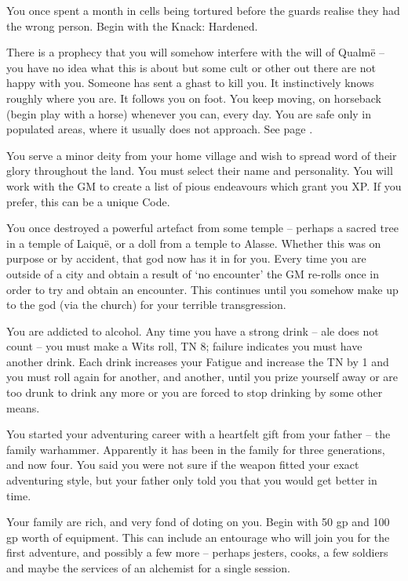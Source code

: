 \begin{multicols}{2}
\begin{list}{\addtocounter{list}{1}\textbf{:}}{\raggedleft}
\item{You once spent a month in cells being tortured before the guards realise they had the wrong person.  Begin with the Knack: Hardened.}

\item{There is a prophecy that you will somehow interfere with the will of Qualm\"{e} -- you have no idea what this is about but some cult or other out there are not happy with you.  Someone has sent a ghast to kill you.  It instinctively knows roughly where you are.  It follows you on foot. You keep moving, on horseback (begin play with a horse) whenever you can, every day.  You are safe only in populated areas, where it usually does not approach.  See page \pageref{ghast}.}

\item{You serve a minor deity from your home village and wish to spread word of their glory throughout the land.  You must select their name and personality.  You will work with the GM to create a list of pious endeavours which grant you XP.  If you prefer, this can be a unique Code.}

\item{You once destroyed a powerful artefact from some temple -- perhaps a sacred tree in a temple of Laiqu\"{e}, or a doll from a temple to Alasse.
Whether this was on purpose or by accident, that god now has it in for you.  Every time you are outside of a city and obtain a result of `no encounter' the GM re-rolls once in order to try and obtain an encounter.
This continues until you somehow make up to the god (via the church) for your terrible transgression.}

\item{You are addicted to alcohol.  Any time you have a strong drink -- ale does not count -- you must make a Wits roll, TN 8; failure indicates you must have another drink.  Each drink increases your Fatigue and increase the TN by 1 and you must roll again for another, and another, until you prize yourself away or are too drunk to drink any more or you are forced to stop drinking by some other means.}

\item{You started your adventuring career with a heartfelt gift from your father -- the family warhammer.  Apparently it has been in the family for three generations, and now four.  You said you were not sure if the weapon fitted your exact adventuring style, but your father only told you that you would get better in time.}

\item{Your family are rich, and very fond of doting on you.  Begin with 50 gp and 100 gp worth of equipment.  This can include an entourage who will join you for the first adventure, and possibly a few more -- perhaps jesters, cooks, a few soldiers and maybe the services of an alchemist for a single session.}


\end{list}
\end{multicols}
